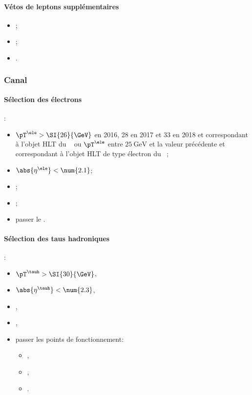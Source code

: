 \paragraph{Vétos de leptons supplémentaires}
\LeptonVetoes
\begin{itemize}
    \item \LeptonVetoesSecondMuon;
    \item \LeptonVetoesExtraEle;
    \item \LeptonVetoesMuonPair.
\end{itemize}

\subsubsection{Canal \ele\tauh}\label{chapter-HTT_analysis-section-offline-et}
\paragraph{Sélection des électrons}
:
\begin{itemize}
    \item $\pT^{\ele} > \SI{26}{\GeV}$ en 2016, \num{28} en 2017 et \num{33} en 2018 et correspondant à l'objet HLT du \HLTpath\ \HLTSingleEle{} ou $\pT^{\ele}$ entre $\SI{25}{\GeV}$ et la valeur précédente et correspondant à l'objet HLT de type électron du \HLTpath\ \HLTEleTauCross{};
    \item $\abs{\eta^{\ele}} < \num{2.1}$;
    \item \Leptondzdxy;
    \item {};
    \item passer le \NinetyNineEleMVA.
\end{itemize}
\paragraph{Sélection des taus hadroniques}
:
\begin{itemize}
    \item $\pT^{\tauh} > \SI{30}{\GeV}$,
    \item $\abs{\eta^{\tauh}} < \num{2.3}$,
    \item \TauHdz,
    \item \NewDecayModeFinding,
    \item passer les points de fonctionnement:
        \begin{itemize}
            \item {},
            \item {},
            \item {}.
        \end{itemize}
\end{itemize}

